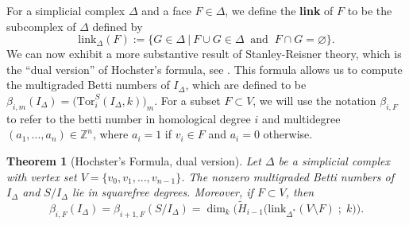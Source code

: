 \documentclass[12pt,leqno]{amsart}
\newtheorem{theorem}[lemma]{Theorem}
\theoremstyle{definition}
\begin{document}
%
For a simplicial complex $\Delta$ and a face $F \in \Delta$, we define the \textbf{link} of $F$ to be the subcomplex of $\Delta$ defined by
%
\begin{displaymath}
  \mathrm{link}_\Delta(F) := \{ G \in \Delta \ | \ F \cup G \in \Delta \ \text{ and } \ F \cap G = \varnothing \}.
\end{displaymath}
%
We can now exhibit a more substantive result of Stanley-Reisner theory, which is the ``dual version'' of Hochster's formula, see \cite[Corollary 1.40]{MS}. This formula allows us to compute the multigraded Betti numbers of $I_\Delta$, which are defined to be $\beta_{i,m}(I_\Delta) = \big( \mathrm{Tor}_i^S(I_\Delta, k) \big)_m$. For a subset $F \subset V$, we will use the notation $\beta_{i,F}$ to refer to the betti number in homological degree $i$ and multidegree $(a_1,...,a_n) \in \mathbb Z^n$, where $a_i = 1$ if $v_i \in F$ and $a_i = 0$ otherwise.
%
\begin{theorem}[Hochster's Formula, dual version]
  Let $\Delta$ be a simplicial complex with vertex set $V = \{ v_0,v_1,...,v_{n-1} \}$. The nonzero multigraded Betti numbers of $I_\Delta$ and $S/I_\Delta$ lie in squarefree degrees. Moreover, if $F \subset V$, then
  \begin{displaymath}
    \beta_{i,F} (I_\Delta) = \beta_{i+1,F} (S/I_\Delta) = \dim_k\Big(\widetilde H_{i-1} \big( \mathrm{link}_{\Delta^*}(V \setminus F)\; ; \; k \big) \Big).
  \end{displaymath}
\end{theorem}
%
\end{document}
